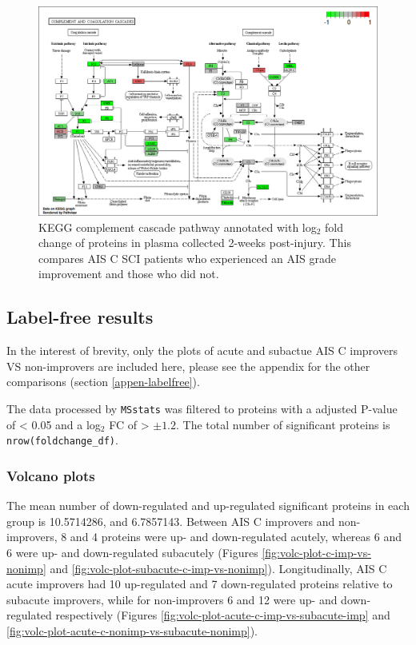 \documentclass[9pt,lineno]{elife}
\begin{document}
\begin{figure}

{\centering \includegraphics[width=18.31in]{figures/kegg_pathways/hsa04610_pathview} 

}

\caption{KEGG complement cascade pathway annotated with log\(_2\) fold change of proteins in plasma collected 2-weeks post-injury. This compares AIS C SCI patients who experienced an AIS grade improvement and those who did not.}\label{fig:kegg-complement}
\end{figure}

\clearpage

\hypertarget{chap-4-results}{%
\subsection{Label-free results}\label{chap-4-results}}

In the interest of brevity, only the plots of acute and subactue AIS C improvers VS non-improvers are included here, please see the appendix for the other comparisons (section \ref{appen-labelfree}).

The data processed by \texttt{MSstats} was filtered to proteins with a adjusted P-value of \textless{} 0.05 and a log\(_2\) FC of \textgreater{} \(\pm1.2\).
The total number of significant proteins is \texttt{nrow(foldchange\_df)}.

\hypertarget{volcano-plots}{%
\subsubsection{Volcano plots}\label{volcano-plots}}

The mean number of down-regulated and up-regulated significant proteins in each group is 10.5714286, and 6.7857143.
Between AIS C improvers and non-improvers, 8 and 4 proteins were up- and down-regulated acutely, whereas 6 and 6 were up- and down-regulated subacutely (Figures \ref{fig:volc-plot-c-imp-vs-nonimp} and \ref{fig:volc-plot-subacute-c-imp-vs-nonimp}).
Longitudinally, AIS C acute improvers had 10 up-regulated and 7 down-regulated proteins relative to subacute improvers, while for non-improvers 6 and 12 were up- and down-regulated respectively (Figures \ref{fig:volc-plot-acute-c-imp-vs-subacute-imp} and \ref{fig:volc-plot-acute-c-nonimp-vs-subacute-nonimp}).
\end{document}
